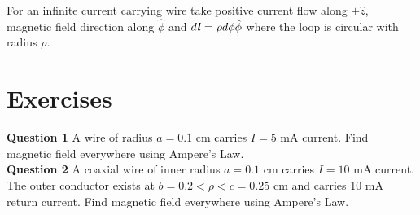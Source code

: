 \documentclass[12pt,a4paper]{article}
\begin{document}
For an infinite current carrying wire take positive current flow along $+\hat z$, magnetic field direction along $\hat \phi$ and $d\textbf{\textit{l}}=\rho d\phi\hat\phi$ where the loop is circular with radius $\rho$.
\newpage
\section{Exercises}
\noindent\textbf{Question 1} A wire of radius $a=0.1$ cm carries $I=5$ mA current. Find magnetic field everywhere using Ampere's Law.\\[0.2cm]
\noindent\textbf{Question 2} A coaxial wire of inner radius $a=0.1$ cm carries $I=10$ mA current. The outer conductor exists at $b=0.2<\rho<c=0.25$ cm and carries 10 mA return current. Find magnetic field everywhere using Ampere's Law.\\[0.2cm]


\end{document}
